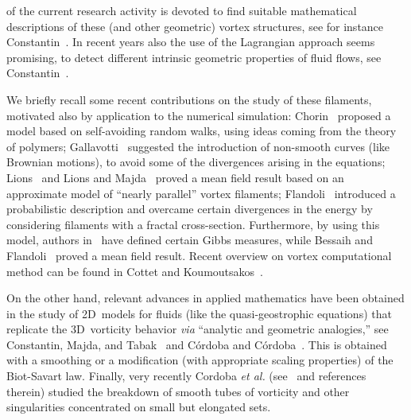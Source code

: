 \documentclass[a4paper,11pt]{article}
\numberwithin{equation}{section}
\begin{document}
of the current research activity is devoted to find suitable
mathematical descriptions of these (and other geometric) vortex
structures, see for instance Constantin~\cite{MR95d:76057}. In recent
years also the use of the Lagrangian approach seems promising, to
detect different intrinsic geometric properties of fluid flows, see
Constantin~\cite{aa}. \par   
%
We briefly recall some recent contributions on the study of these
filaments, motivated also by application to the numerical simulation:
Chorin~\cite{MR95m:76043} proposed a model based on self-avoiding
random walks, using ideas coming from the theory of polymers;
Gallavotti~\cite{g} suggested the introduction of non-smooth curves
(like Brownian motions), to avoid some of the divergences arising in
the equations; Lions~\cite{l} and Lions and Majda~\cite{lm} proved a
mean field result based on an approximate model of ``nearly parallel''
vortex filaments; Flandoli~\cite{franco} introduced a probabilistic 
description and overcame certain divergences in the energy by
considering filaments with a fractal cross-section. Furthermore, by
using this model, authors in~\cite{FG} have defined
certain Gibbs measures, while Bessaih and Flandoli~\cite{BF} proved a
mean field result. Recent overview on vortex computational method can
be found in Cottet and Koumoutsakos~\cite{ck}.\par
%
On the other hand, relevant advances in applied mathematics have been
obtained in the study of 2D~models for fluids (like the quasi-geostrophic
equations) that replicate the 3D~vorticity behavior \textit{via}
``analytic and geometric analogies,'' see Constantin, Majda, and
Tabak~\cite{MR95i:76107} and C\'ordoba and C\'ordoba~\cite{cc}. This is
obtained with a smoothing or a modification 
(with appropriate scaling properties) of the Biot-Savart law. Finally,
very recently Cordoba \textit{et al.} (see~\cite{cf} and references
therein) studied the breakdown of smooth tubes of vorticity and other
singularities concentrated on small but elongated sets.\par 
\end{document}
